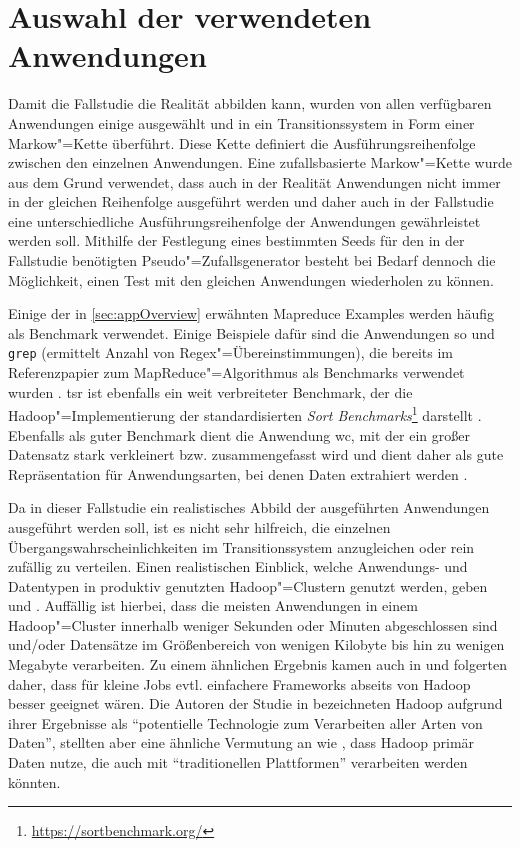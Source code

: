 \section{Auswahl der verwendeten Anwendungen}\label{sec:appSelection}

Damit die Fallstudie die Realität abbilden kann, wurden von allen verfügbaren Anwendungen einige ausgewählt und in ein Transitionssystem in Form einer Markow"=Kette überführt.
Diese Kette definiert die Ausführungsreihenfolge zwischen den einzelnen Anwendungen.
Eine zufallsbasierte Markow"=Kette wurde aus dem Grund verwendet, dass auch in der Realität Anwendungen nicht immer in der gleichen Reihenfolge ausgeführt werden und daher auch in der Fallstudie eine unterschiedliche Ausführungsreihenfolge der Anwendungen gewährleistet werden soll.
Mithilfe der Festlegung eines bestimmten Seeds für den in der Fallstudie benötigten Pseudo"=Zufallsgenerator besteht bei Bedarf dennoch die Möglichkeit, einen Test mit den gleichen Anwendungen wiederholen zu können.

Einige der in \autoref{sec:appOverview} erwähnten Mapreduce Examples werden häufig als Benchmark verwendet.
Einige Beispiele dafür sind die Anwendungen \acl{so} und \texttt{grep} (ermittelt Anzahl von Regex"=Übereinstimmungen), die bereits im Referenzpapier zum MapReduce"=Algorithmus als Benchmarks verwendet wurden \cite{Dean2008}.
\acl{tsr} ist ebenfalls ein weit verbreiteter Benchmark, der die Hadoop"=Implementierung der standardisierten \emph{Sort Benchmarks}\footnote{\url{https://sortbenchmark.org/}} darstellt \cite{Graves2013}.
Ebenfalls als guter Benchmark dient die Anwendung \acl{wc}, mit der ein großer Datensatz stark verkleinert bzw. zusammengefasst wird und dient daher als gute Repräsentation für Anwendungsarten, bei denen Daten extrahiert werden \cite{Huang2010,Chen2012}.

Da in dieser Fallstudie ein realistisches Abbild der ausgeführten Anwendungen ausgeführt werden soll, ist es nicht sehr hilfreich, die einzelnen Übergangswahrscheinlichkeiten im Transitionssystem anzugleichen oder rein zufällig zu verteilen.
Einen realistischen Einblick, welche Anwendungs- und Datentypen in produktiv genutzten Hadoop"=Clustern genutzt werden, geben \uA \cite{Chen2012} und \cite{HadoopDataTypes}.
Auffällig ist hierbei, dass die meisten Anwendungen in einem Hadoop"=Cluster innerhalb weniger Sekunden oder Minuten abgeschlossen sind und/oder Datensätze im Größenbereich von wenigen Kilobyte bis hin zu wenigen Megabyte verarbeiten.
Zu einem ähnlichen Ergebnis kamen auch \citeauthor{Ren2013} in \cite{Ren2013} und folgerten daher, dass für kleine Jobs evtl. einfachere Frameworks abseits von Hadoop besser geeignet wären.
Die Autoren der Studie in \cite{HadoopDataTypes} bezeichneten Hadoop aufgrund ihrer Ergebnisse als \enquote{potentielle Technologie zum Verarbeiten aller Arten von Daten}, stellten aber eine ähnliche Vermutung an wie \citeauthor{Ren2013}, dass Hadoop primär Daten nutze, die auch mit \enquote{traditionellen Plattformen} verarbeiten werden könnten.

